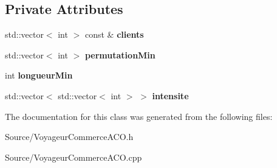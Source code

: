 \subsection*{\-Private \-Attributes}
\begin{DoxyCompactItemize}
\item 
\hypertarget{classVoyageurCommerceACO_a9758ddbb1e60eb3c0b87766941a08019}{std\-::vector$<$ int $>$ const \& {\bfseries clients}}\label{classVoyageurCommerceACO_a9758ddbb1e60eb3c0b87766941a08019}

\item 
\hypertarget{classVoyageurCommerceACO_a167179d4a335a0a64c7cad2bfc6c803e}{std\-::vector$<$ int $>$ {\bfseries permutation\-Min}}\label{classVoyageurCommerceACO_a167179d4a335a0a64c7cad2bfc6c803e}

\item 
\hypertarget{classVoyageurCommerceACO_a40fabb055842bd96f6aae08a1fc2e10f}{int {\bfseries longueur\-Min}}\label{classVoyageurCommerceACO_a40fabb055842bd96f6aae08a1fc2e10f}

\item 
\hypertarget{classVoyageurCommerceACO_aab8fde9e364ded0695964212632f82a0}{std\-::vector$<$ std\-::vector$<$ int $>$ $>$ {\bfseries intensite}}\label{classVoyageurCommerceACO_aab8fde9e364ded0695964212632f82a0}

\end{DoxyCompactItemize}


\-The documentation for this class was generated from the following files\-:\begin{DoxyCompactItemize}
\item 
\-Source/\-Voyageur\-Commerce\-A\-C\-O.\-h\item 
\-Source/\-Voyageur\-Commerce\-A\-C\-O.\-cpp\end{DoxyCompactItemize}
